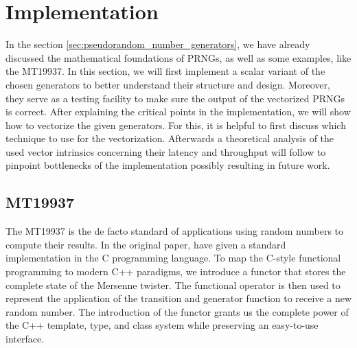 \documentclass{stdlocal}
\begin{document}
\section{Implementation} %
\label{sec:implementation}
  In the section \ref{sec:pseudorandom_number_generators}, we have already discussed the mathematical foundations of PRNGs, as well as some examples, like the MT19937.
  In this section, we will first implement a scalar variant of the chosen generators to better understand their structure and design.
  Moreover, they serve as a testing facility to make sure the output of the vectorized PRNGs is correct.
  After explaining the critical points in the implementation, we will show how to vectorize the given generators.
  For this, it is helpful to first discuss which technique to use for the vectorization.
  Afterwards a theoretical analysis of the used vector intrinsics concerning their latency and throughput will follow to pinpoint bottlenecks of the implementation possibly resulting in future work.

  \subsection{MT19937} %
  \label{sub:mersenne_twister}
    The MT19937 is the de facto standard of applications using random numbers to compute their results.
    In the original paper, \citeauthor{matsumoto1998} have given a standard implementation in the C programming language.
    To map the C-style functional programming to modern C++ paradigms, we introduce a functor that stores the complete state of the Mersenne twister.
    The functional operator is then used to represent the application of the transition and generator function to receive a new random number.
    The introduction of the functor grants us the complete power of the C++ template, type, and class system while preserving an easy-to-use interface.
\end{document}
